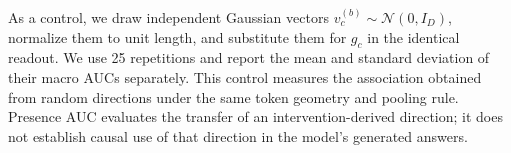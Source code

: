 As a control, we draw independent Gaussian vectors
\(v_c^{(b)}\sim\mathcal N(0,I_D)\), normalize them to unit length, and
substitute them for \(g_c\) in the identical readout. We use 25 repetitions
and report the mean and standard deviation of their macro AUCs separately.
This control measures the association obtained from random directions
under the same token geometry and pooling rule. Presence AUC evaluates
the transfer of an intervention-derived direction; it does not establish
causal use of that direction in the model's generated answers.

